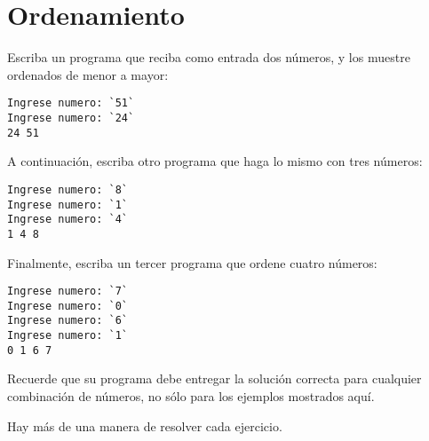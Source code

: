 \section{Ordenamiento}

Escriba un programa que reciba como entrada dos números, y los muestre
ordenados de menor a mayor:

\begin{lstlisting}[language=testcase]
Ingrese numero: `51`
Ingrese numero: `24`
24 51
\end{lstlisting}

A continuación, escriba otro programa que haga lo mismo con tres
números:

\begin{lstlisting}[language=testcase]
Ingrese numero: `8`
Ingrese numero: `1`
Ingrese numero: `4`
1 4 8
\end{lstlisting}

Finalmente, escriba un tercer programa que ordene cuatro números:

\begin{lstlisting}[language=testcase]
Ingrese numero: `7`
Ingrese numero: `0`
Ingrese numero: `6`
Ingrese numero: `1`
0 1 6 7
\end{lstlisting}

Recuerde que su programa debe entregar la solución correcta para
cualquier combinación de números, no sólo para los ejemplos mostrados
aquí.

Hay más de una manera de resolver cada ejercicio.
